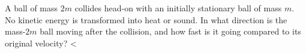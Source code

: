         A ball of mass $2m$ collides head-on with an initially stationary ball of
        mass $m$. No kinetic energy is transformed into heat or sound. In what direction
        is the mass-$2m$ ball moving after the collision, and how fast is it going
        compared to its original velocity?
        <%
